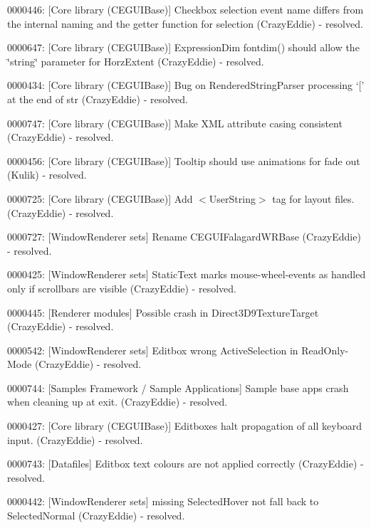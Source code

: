 \begin{DoxyItemize}
\item 0000446\+: \mbox{[}Core library (C\+E\+G\+U\+I\+Base)\mbox{]} Checkbox selection event name differs from the internal naming and the getter function for selection (Crazy\+Eddie) -\/ resolved.
\item 0000647\+: \mbox{[}Core library (C\+E\+G\+U\+I\+Base)\mbox{]} Expression\+Dim fontdim() should allow the \char`\"{}string\char`\"{} parameter for Horz\+Extent (Crazy\+Eddie) -\/ resolved.
\item 0000434\+: \mbox{[}Core library (C\+E\+G\+U\+I\+Base)\mbox{]} Bug on Rendered\+String\+Parser processing `\mbox{[}' at the end of str (Crazy\+Eddie) -\/ resolved.
\item 0000747\+: \mbox{[}Core library (C\+E\+G\+U\+I\+Base)\mbox{]} Make X\+ML attribute casing consistent (Crazy\+Eddie) -\/ resolved.
\item 0000456\+: \mbox{[}Core library (C\+E\+G\+U\+I\+Base)\mbox{]} Tooltip should use animations for fade out (Kulik) -\/ resolved.
\item 0000725\+: \mbox{[}Core library (C\+E\+G\+U\+I\+Base)\mbox{]} Add $<$\+User\+String$>$ tag for layout files. (Crazy\+Eddie) -\/ resolved.
\item 0000727\+: \mbox{[}Window\+Renderer sets\mbox{]} Rename C\+E\+G\+U\+I\+Falagard\+W\+R\+Base (Crazy\+Eddie) -\/ resolved.
\item 0000425\+: \mbox{[}Window\+Renderer sets\mbox{]} Static\+Text marks mouse-\/wheel-\/events as handled only if scrollbars are visible (Crazy\+Eddie) -\/ resolved.
\item 0000445\+: \mbox{[}Renderer modules\mbox{]} Possible crash in Direct3\+D9\+Texture\+Target (Crazy\+Eddie) -\/ resolved.
\item 0000542\+: \mbox{[}Window\+Renderer sets\mbox{]} Editbox wrong Active\+Selection in Read\+Only-\/\+Mode (Crazy\+Eddie) -\/ resolved.
\item 0000744\+: \mbox{[}Samples Framework / Sample Applications\mbox{]} Sample base apps crash when cleaning up at exit. (Crazy\+Eddie) -\/ resolved.
\item 0000427\+: \mbox{[}Core library (C\+E\+G\+U\+I\+Base)\mbox{]} Editboxes halt propagation of all keyboard input. (Crazy\+Eddie) -\/ resolved.
\item 0000743\+: \mbox{[}Datafiles\mbox{]} Editbox text colours are not applied correctly (Crazy\+Eddie) -\/ resolved.
\item 0000442\+: \mbox{[}Window\+Renderer sets\mbox{]} missing \textquotesingle{}Selected\+Hover\textquotesingle{} not fall back to \textquotesingle{}Selected\+Normal\textquotesingle{} (Crazy\+Eddie) -\/ resolved.

\end{DoxyItemize}
